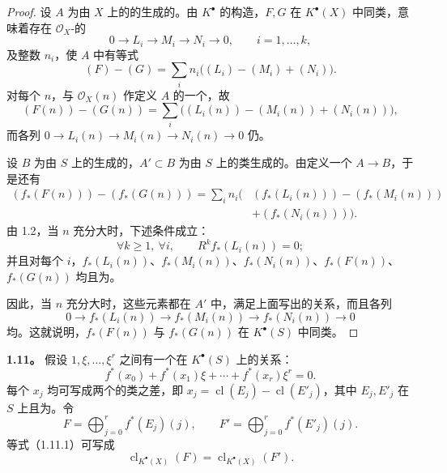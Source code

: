 \begin{proof}
设 $A$ 为由 $X$ 上的的生成的。由 $K^\bullet$ 的构造，$F,G$ 在 $K^\bullet(X)$ 中同类，意味着存在 $\mathcal O_X$-的
\[
0\longrightarrow L_i\longrightarrow M_i\longrightarrow N_i\longrightarrow0,
\qquad i=1,\ldots,k,
\]
及整数 $n_i$，使 $A$ 中有等式
\[
(F)-(G)=\sum_i n_i\bigl((L_i)-(M_i)+(N_i)\bigr).
\]
对每个 $n$，与 $\mathcal O_X(n)$ 作定义 $A$ 的一个，故
\[
(F(n))-(G(n))=\sum_i\bigl((L_i(n))-(M_i(n))+(N_i(n))\bigr),
\]
而各列 $0\to L_i(n)\to M_i(n)\to N_i(n)\to0$ 仍。

设 $B$ 为由 $S$ 上的生成的，$A'\subset B$ 为由 $S$ 上的类生成的。由定义一个 $A\to B$，于是还有
\[
\begin{aligned}
(f_*(F(n)))-(f_*(G(n)))
=\sum_i n_i\bigl(&(f_*(L_i(n)))-(f_*(M_i(n)))\\
&+(f_*(N_i(n)))\bigr).
\end{aligned}
\]
由 1.2，当 $n$ 充分大时，下述条件成立：
\[
\forall k\geq1,\ \forall i,\qquad R^kf_*(L_i(n))=0;
\]
并且对每个 $i$，$f_*(L_i(n))$、$f_*(M_i(n))$、$f_*(N_i(n))$、$f_*(F(n))$、$f_*(G(n))$ 均且为。

因此，当 $n$ 充分大时，这些元素都在 $A'$ 中，满足上面写出的关系，而且各列
\[
0\longrightarrow f_*(L_i(n))\longrightarrow f_*(M_i(n))
\longrightarrow f_*(N_i(n))\longrightarrow0
\]
均。这就说明，$f_*(F(n))$ 与 $f_*(G(n))$ 在 $K^\bullet(S)$ 中同类。
\end{proof}
\textbf{1.11。} 假设 $1,\xi,\ldots,\xi^r$ 之间有一个在 $K^\bullet(S)$ 上的关系：
\[
f^*(x_0)+f^*(x_1)\xi+\cdots+f^*(x_r)\xi^r=0.\tag{1.11.1}
\]
每个 $x_j$ 均可写成两个的类之差，即 $x_j=\operatorname{cl}(E_j)-\operatorname{cl}(E'_j)$，其中 $E_j,E'_j$ 在 $S$ 上且为。令
\[
F=\bigoplus_{j=0}^r f^*(E_j)(j),\qquad
F'=\bigoplus_{j=0}^r f^*(E'_j)(j).
\]
等式（1.11.1）可写成
\[
\operatorname{cl}_{K^\bullet(X)}(F)=\operatorname{cl}_{K^\bullet(X)}(F').
\]
